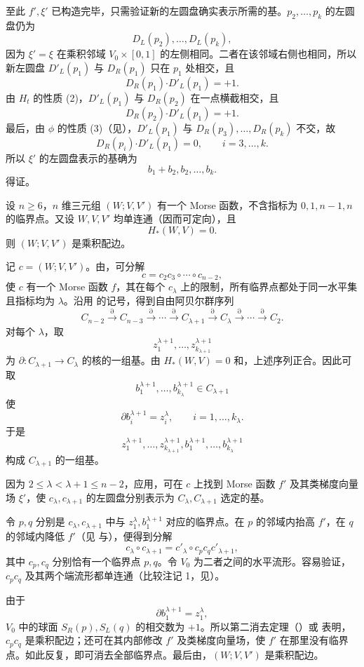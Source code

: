 至此 $f',\xi'$ 已构造完毕，只需验证新的左圆盘确实表示所需的基。$p_2,\ldots,p_k$ 的左圆盘仍为
\[
  D_L(p_2),\ldots,D_L(p_k),
\]
因为 $\xi'=\xi$ 在乘积邻域 $V_0\times[0,1]$ 的左侧相同。二者在该邻域右侧也相同，所以新左圆盘 $D'_L(p_1)$ 与 $D_R(p_1)$ 只在 $p_1$ 处相交，且
\[
  D_R(p_1)\mathbin{\boldsymbol\cdot}D'_L(p_1)=+1.
\]
由 $H_t$ 的性质 (2)，$D'_L(p_1)$ 与 $D_R(p_2)$ 在一点横截相交，且
\[
  D_R(p_2)\mathbin{\boldsymbol\cdot}D'_L(p_1)=+1.
\]
最后，由 $\phi$ 的性质 (3)（见），$D'_L(p_1)$ 与 $D_R(p_3),\ldots,D_R(p_k)$ 不交，故
\[
  D_R(p_i)\mathbin{\boldsymbol\cdot}D'_L(p_1)=0,
  \qquad i=3,\ldots,k.
\]
所以 $\xi'$ 的左圆盘表示的基确为
\[
  b_1+b_2,b_2,\ldots,b_k.
\]
 得证。
\EndProof

设 $n\geq6$，$n$ 维三元组 $(W;V,V')$ 有一个 Morse 函数，不含指标为 $0,1,n-1,n$ 的临界点。又设 $W,V,V'$ 均单连通（因而可定向），且
\[
  H_*(W,V)=0.
\]
则 $(W;V,V')$ 是乘积配边。

\Proof 记 $c=(W;V,V')$。由，可分解
\[
  c=c_2c_3\circ\cdots\circ c_{n-2},
\]
使 $c$ 有一个 Morse 函数 $f$，其在每个 $c_\lambda$ 上的限制，所有临界点都处于同一水平集且指标均为 $\lambda$。沿用 的记号，得到自由阿贝尔群序列
\[
  C_{n-2}\xrightarrow{\partial}C_{n-3}\xrightarrow{\partial}
  \cdots\xrightarrow{\partial}C_{\lambda+1}\xrightarrow{\partial}
  C_\lambda\xrightarrow{\partial}\cdots\xrightarrow{\partial}C_2.
\]
对每个 $\lambda$，取
\[
  z^{\lambda+1}_1,\ldots,z^{\lambda+1}_{k_{\lambda+1}}
\]
为 $\partial:C_{\lambda+1}\to C_\lambda$ 的核的一组基。由 $H_*(W,V)=0$ 和，上述序列正合。因此可取
\[
  b^{\lambda+1}_1,\ldots,b^{\lambda+1}_{k_\lambda}\in C_{\lambda+1}
\]
使
\[
  \partial b^{\lambda+1}_i=z^\lambda_i,
  \qquad i=1,\ldots,k_\lambda.
\]
于是
\[
  z^{\lambda+1}_1,\ldots,z^{\lambda+1}_{k_{\lambda+1}},
  b^{\lambda+1}_1,\ldots,b^{\lambda+1}_{k_\lambda}
\]
构成 $C_{\lambda+1}$ 的一组基。

因为 $2\leq\lambda<\lambda+1\leq n-2$，应用，可在 $c$ 上找到 Morse 函数 $f'$ 及其类梯度向量场 $\xi'$，使 $c_\lambda,c_{\lambda+1}$ 的左圆盘分别表示为 $C_\lambda,C_{\lambda+1}$ 选定的基。

令 $p,q$ 分别是 $c_\lambda,c_{\lambda+1}$ 中与 $z^\lambda_1,b^{\lambda+1}_1$ 对应的临界点。在 $p$ 的邻域内抬高 $f'$，在 $q$ 的邻域内降低 $f'$（见 与），便得到分解
\[
  c_\lambda\circ c_{\lambda+1}
  =c'_\lambda\circ c_pc_qc'_{\lambda+1},
\]
其中 $c_p,c_q$ 分别恰有一个临界点 $p,q$。令 $V_0$ 为二者之间的水平流形。容易验证，$c_pc_q$ 及其两个端流形都单连通（比较注记 1，见）。

由于
\[
  \partial b^{\lambda+1}_1=z^\lambda_1,
\]
$V_0$ 中的球面 $S_R(p),S_L(q)$ 的相交数为 $+1$。所以第二消去定理（）或 表明，$c_pc_q$ 是乘积配边；还可在其内部修改 $f'$ 及类梯度向量场，使 $f'$ 在那里没有临界点。如此反复，即可消去全部临界点。最后由，$(W;V,V')$ 是乘积配边。
\EndProof
